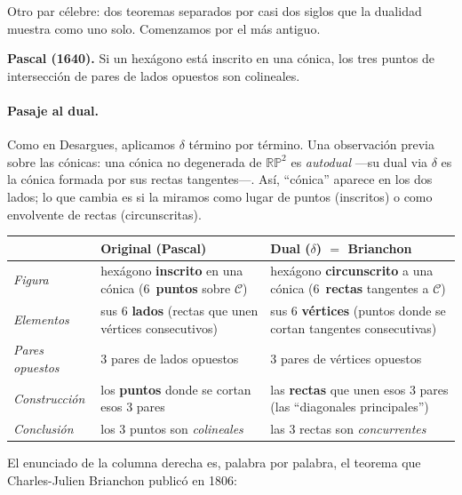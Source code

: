 \documentclass[11pt,a4paper]{article}
\newcommand{\RP}{\mathbb{RP}}
\begin{document}
Otro par célebre: dos teoremas separados por casi dos siglos que la
dualidad muestra como uno solo. Comenzamos por el más antiguo.

\begin{teorema}
\textbf{Pascal (1640).} Si un hexágono está inscrito en una cónica, los
tres puntos de intersección de pares de lados opuestos son colineales.
\end{teorema}

\paragraph{Pasaje al dual.}
Como en Desargues, aplicamos $\delta$ término por término. Una
observación previa sobre las cónicas: una cónica no degenerada de
$\RP^2$ es \emph{autodual} —su dual via $\delta$ es la cónica formada
por sus rectas tangentes—. Así, ``cónica'' aparece en los dos lados; lo
que cambia es si la miramos como lugar de puntos (inscritos) o como
envolvente de rectas (circunscritas).

\begin{center}
\renewcommand{\arraystretch}{1.4}
\begin{tabular}{@{}p{}p{}p{}@{}}
\toprule
 & \textbf{Original (Pascal)} & \textbf{Dual ($\delta$) $=$ Brianchon} \\
\midrule
\textit{Figura} &
hexágono \textbf{inscrito} en una cónica (6~\textbf{puntos} sobre $\mathcal C$) &
hexágono \textbf{circunscrito} a una cónica (6~\textbf{rectas} tangentes a $\mathcal C$) \\
\textit{Elementos} &
sus 6 \textbf{lados} (rectas que unen vértices consecutivos) &
sus 6 \textbf{vértices} (puntos donde se cortan tangentes consecutivas) \\
\textit{Pares opuestos} &
3 pares de lados opuestos &
3 pares de vértices opuestos \\
\textit{Construcción} &
los \textbf{puntos} donde se cortan esos 3 pares &
las \textbf{rectas} que unen esos 3 pares (las ``diagonales principales'') \\
\textit{Conclusión} &
los 3 puntos son \emph{colineales} &
las 3 rectas son \emph{concurrentes} \\
\bottomrule
\end{tabular}
\end{center}

\noindent El enunciado de la columna derecha es, palabra por palabra, el
teorema que Charles-Julien Brianchon publicó en 1806:
\end{document}
